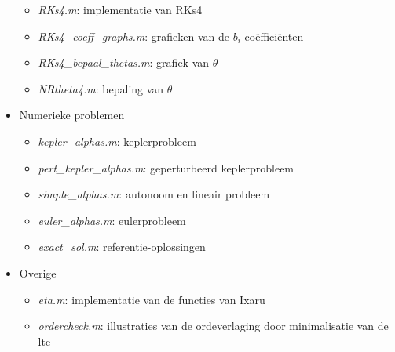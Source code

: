 \documentclass[12pt]{article}
\begin{document}
\begin{itemize}
\begin{itemize}
        \item \textit{RKs4.m}: implementatie van RKs4
        \item \textit{RKs4\_coeff\_graphs.m}: grafieken van de \(b_i\)-coëfficiënten
        \item \textit{RKs4\_bepaal\_thetas.m}: grafiek van \(\theta\)
        \item \textit{NRtheta4.m}: bepaling van \(\theta\)
    \end{itemize}
    \item Numerieke problemen
    \begin{itemize}
        \item \textit{kepler\_alphas.m}: keplerprobleem
        \item \textit{pert\_kepler\_alphas.m}: geperturbeerd keplerprobleem
        \item \textit{simple\_alphas.m}: autonoom en lineair probleem
        \item \textit{euler\_alphas.m}: eulerprobleem
        \item \textit{exact\_sol.m}: referentie-oplossingen
    \end{itemize}
    \item Overige
    \begin{itemize}
        \item \textit{eta.m}: implementatie van de functies van Ixaru
        \item \textit{ordercheck.m}: illustraties van de ordeverlaging door minimalisatie van de lte
    \end{itemize}
\end{itemize}
\end{document}
